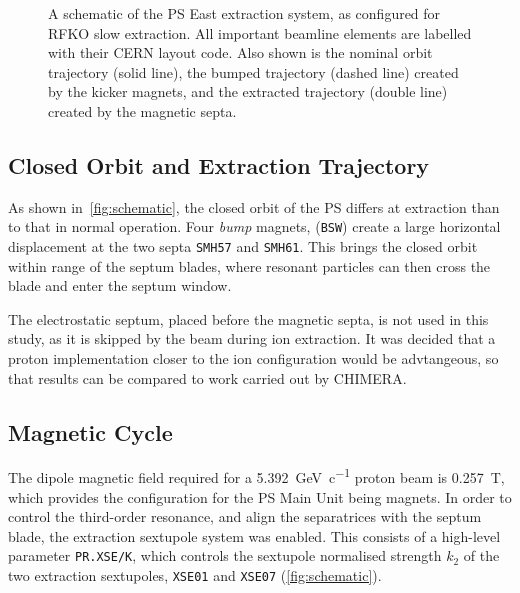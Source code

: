 \documentclass[11pt]{report}
\begin{document}
\begin{figure}
  \caption{A schematic of the PS East extraction system, as configured for RFKO slow extraction. All important beamline elements are labelled with their CERN layout code. Also shown is the nominal orbit trajectory (solid line), the bumped trajectory (dashed line) created by the kicker magnets, and the extracted trajectory (double line) created by the magnetic septa.}\label{fig:schematic}
\end{figure}

\subsection{Closed Orbit and Extraction Trajectory}

As shown in~\autoref{fig:schematic}, the closed orbit of the PS differs at extraction than to that in normal operation. Four \textit{bump} magnets, (\verb|BSW|) create a large horizontal displacement at the two septa \verb|SMH57| and \verb|SMH61|. This brings the closed orbit within range of the septum blades, where resonant particles can then cross the blade and enter the septum window.

The electrostatic septum, placed before the magnetic septa, is not used in this study, as it is skipped by the beam during ion extraction. It was decided that a proton implementation closer to the ion configuration would be advtangeous, so that results can be compared to work carried out by CHIMERA.

\subsection{Magnetic Cycle}

The dipole magnetic field required for a \qty[per-mode=symbol]{5.392}{\giga\electronvolt\per~c} proton beam is \qty{0.257}{\tesla}, which provides the configuration for the PS Main Unit being magnets. In order to control the third-order resonance, and align the separatrices with the septum blade, the extraction sextupole system was enabled. This consists of a high-level parameter \verb|PR.XSE/K|, which controls the sextupole normalised strength $k_2$ of the two extraction sextupoles, \verb|XSE01| and \verb|XSE07| (\autoref{fig:schematic}). 
\end{document}
